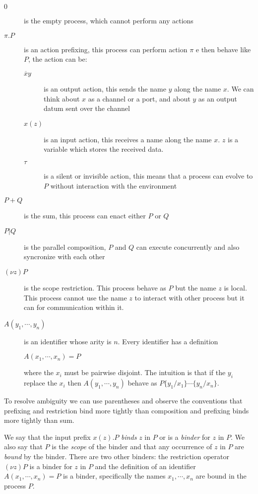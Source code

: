 \begin{description}
  \item[$0$] 
    is the empty process, which cannot perform any actions
  \item[$\pi.P$] 
    is an action prefixing, this process can perform action $\pi$ e then behave like $P$, the action can be:
    \begin{description}
      \item[$\overline{x}y$] 
	is an output action, this sends the name $y$ along the name $x$. We can think about $x$ as a channel or a port, and about $y$ as an output datum sent over the channel
      \item[$x(z)$] 
	is an input action, this receives a name along the name $x$. $z$ is a variable which stores the received data.
      \item[$\tau$] 
	is a silent or invisible action, this means that a process can evolve to $P$ without interaction with the environment 
    \end{description}
  \item[$P+Q$] 
    is the sum, this process can enact either $P$ or $Q$
  \item[$P|Q$] 
    is the parallel composition, $P$ and $Q$ can execute concurrently and also syncronize with each other
  \item[$(\nu z) P$] 
    is the scope restriction. This process behave as $P$ but the name $z$ is local. This process cannot use the name $z$ to interact with other process but it can for communication within it.
  \item[$A(y_{1}, \cdots, y_{n})$] 
    is an identifier whose arity is $n$. Every identifier has a definition
    \begin{center}
      $A(x_{1}, \cdots, x_{n}) = P$
    \end{center}
    where the $x_{i}$ must be pairwise disjoint. The intuition is that if the $y_{i}$ replace the $x_{i}$ then $A(y_{1}, \cdots, y_{n})$ behave as $P\{y_{1}/x_{1}\} \cdots \{y_{n}/x_{n}\}$. 
\end{description}

To resolve ambiguity we can use parentheses and observe the conventions that prefixing and restriction bind more tightly than composition and prefixing binds more tightly than sum. 

\begin{definition}    
  We say that the input prefix $x(z).P$ \emph{binds} $z$ in $P$ or is a \emph{binder} for $z$ in $P$. We also say that $P$ is the \emph{scope} of the binder and that any occurrence of $z$ in $P$ are \emph{bound} by the binder. There are two other binders: the restriction operator $(\nu z)P$ is a binder for $z$ in $P$ and the definition of an identifier $A(x_{1}, \cdots, x_{n}) = P$ is a binder, specifically the names $x_{1}, \cdots, x_{n}$ are bound in the process $P$.
\end{definition}

